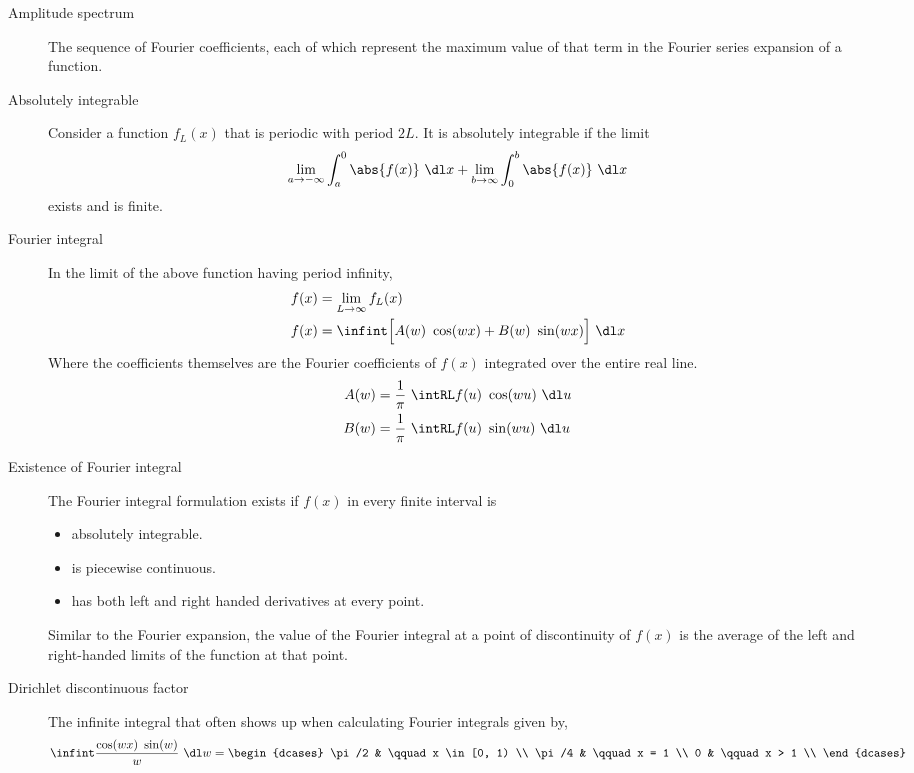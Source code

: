 \begin{description}
    \item[Amplitude spectrum] The sequence of Fourier coefficients, each of which
        represent the maximum value of that term in the Fourier series expansion of a
        function.

    \item[Absolutely integrable] Consider a function $ f_L(x) $ that is periodic with
        period $ 2L $. It is absolutely integrable if the limit
        \begin{align}
            \lim_{a \to -\infty} \int_{a}^{0} \abs{f(x)}\ \dl x +
            \lim_{b \to \infty} \int_{0}^{b} \abs{f(x)}\ \dl x
        \end{align}
        exists and is finite.

    \item[Fourier integral] In the limit of the above function having period infinity,
        \begin{align}
            f(x) & = \lim_{L \to \infty } f_L(x)                              \\
            f(x) & = \infint \Big[A(w)\ \cos(wx) + B(w)\ \sin(wx)\Big]\ \dl x
        \end{align}
        Where the coefficients themselves are the Fourier coefficients of $ f(x) $
        integrated over the entire real line.
        \begin{align}
            A(w) & = \frac{1}{\pi}\ \intRL f(u)\ \cos(wu)\ \dl u \\
            B(w) & = \frac{1}{\pi}\ \intRL f(u)\ \sin(wu)\ \dl u
        \end{align}

    \item[Existence of Fourier integral] The Fourier integral formulation exists if
        $ f(x) $ in every finite interval is
        \begin{itemize}
            \item absolutely integrable.
            \item is piecewise continuous.
            \item has both left and right handed derivatives at every point.
        \end{itemize}
        Similar to the Fourier expansion, the value of the Fourier integral at a point
        of discontinuity of $ f(x) $ is the average of the left and right-handed limits
        of the function at that point.

    \item[Dirichlet discontinuous factor] The infinite integral that often shows up
        when calculating Fourier integrals given by,
        \begin{align}
            \infint \frac{\cos(wx)\ \sin(w)}{w}\ \dl w =
            \begin{dcases}
                \pi/2 & \qquad x \in [0, 1) \\
                \pi/4 & \qquad x = 1        \\
                0     & \qquad x > 1        \\
            \end{dcases}
        \end{align}


\end{description}
